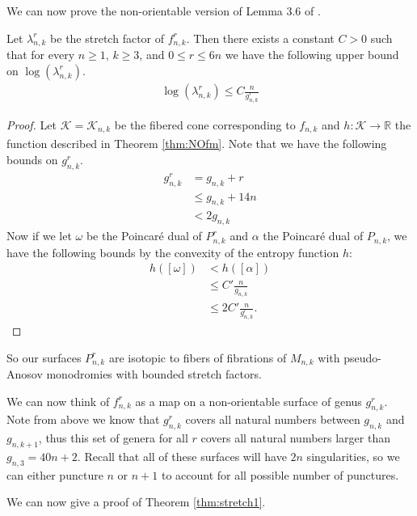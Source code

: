 We can now prove the non-orientable version of Lemma 3.6 of \cite{yazdi2018pseudo}.
\begin{lem}
\label{lem:bound}
Let $\lambda_{n,k}^r$ be the stretch factor of $f_{n,k}^r$. Then there exists a constant $C > 0$ such that for every $n \geq 1$, $k \geq 3$, and $0 \leq r \leq 6n$ we have the following upper bound on $\log(\lambda_{n,k}^r)$.
\begin{align*}
  \log(\lambda^r_{n,k}) \leq C\frac{n}{g^r_{n,k}}
\end{align*}
\end{lem}
\begin{proof}
  Let $\mathcal{K} = \mathcal{K}_{n,k}$ be the fibered cone corresponding to $f_{n,k}$ and $h: \mathcal{K} \xrightarrow[]{} \mathbb{R}$
  the function described in Theorem \ref{thm:NOfm}. Note that we have the following bounds on $g_{n,k}^r$.
  \begin{align*}
    g^r_{n,k} &= g_{n,k} + r \\
              &\leq g_{n,k} + 14n \\
              &< 2g_{n,k}
  \end{align*}
  Now if we let $\omega$ be the Poincar\'e dual of $P^r_{n,k}$ and $\alpha$ the Poincar\'e dual of $P_{n,k}$, we have the following bounds by the convexity of the entropy
  function $h$:
  \begin{align*}
    h([\omega]) &< h([\alpha]) \\
                &\leq C'\frac{n}{g_{n,k}} \\
                &\leq 2C'\frac{n}{g^r_{n,k}}. 
  \end{align*}
\end{proof}

So  our surfaces $P^r_{n,k}$ are isotopic to fibers of fibrations of $M_{n,k}$ with
pseudo-Anosov monodromies with bounded stretch factors.

We can now think of $f^r_{n,k}$ as a map on a non-orientable surface of genus $g^r_{n,k}$. Note from above we
know that $g^r_{n,k}$ covers all natural numbers between $g_{n,k}$ and $g_{n,k+1}$, thus this set of genera
for all $r$ covers all natural numbers larger than $g_{n,3} = 40n + 2$. Recall that all of these surfaces will
have $2n$ singularities, so we can either puncture $n$ or $n + 1$ to account for all possible number of
punctures. 

We can now give a proof of Theorem \ref{thm:stretch1}.

